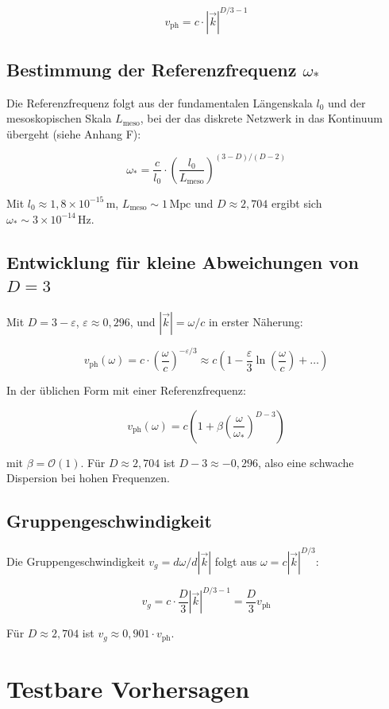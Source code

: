 \[
v_{\text{ph}} = c \cdot |\vec{k}|^{D/3 - 1} \tag{I.14}
\]

\subsection{Bestimmung der Referenzfrequenz $\omega_*$}

Die Referenzfrequenz folgt aus der fundamentalen Längenskala $l_0$ und der 
mesoskopischen Skala $L_{\text{meso}}$, bei der das diskrete Netzwerk in das 
Kontinuum übergeht (siehe Anhang F):

\[
\omega_* = \frac{c}{l_0} \cdot \left( \frac{l_0}{L_{\text{meso}}} \right)^{(3-D)/(D-2)} \tag{I.15}
\]

Mit $l_0 \approx 1,8 \times 10^{-15}\,\text{m}$, $L_{\text{meso}} \sim 1\,\text{Mpc}$ 
und $D \approx 2,704$ ergibt sich $\omega_* \sim 3 \times 10^{-14}\,\text{Hz}$.

\subsection{Entwicklung für kleine Abweichungen von $D=3$}

Mit $D = 3 - \varepsilon$, $\varepsilon \approx 0,296$, und $|\vec{k}| = \omega/c$ 
in erster Näherung:

\[
v_{\text{ph}}(\omega) = c \cdot \left( \frac{\omega}{c} \right)^{-\varepsilon/3} \approx c \left( 1 - \frac{\varepsilon}{3} \ln\left(\frac{\omega}{c}\right) + \ldots \right)
\]

In der üblichen Form mit einer Referenzfrequenz:

\[
v_{\text{ph}}(\omega) = c \left( 1 + \beta \left( \frac{\omega}{\omega_*} \right)^{D-3} \right) \tag{I.16}
\]

mit $\beta = \mathcal{O}(1)$. Für $D \approx 2,704$ ist $D-3 \approx -0,296$, also 
eine schwache Dispersion bei hohen Frequenzen.

\subsection{Gruppengeschwindigkeit}

Die Gruppengeschwindigkeit $v_g = d\omega/d|\vec{k}|$ folgt aus $\omega = c |\vec{k}|^{D/3}$:

\[
v_g = c \cdot \frac{D}{3} |\vec{k}|^{D/3 - 1} = \frac{D}{3} v_{\text{ph}} \tag{I.17}
\]

Für $D \approx 2,704$ ist $v_g \approx 0,901 \cdot v_{\text{ph}}$.

\section{Testbare Vorhersagen}

